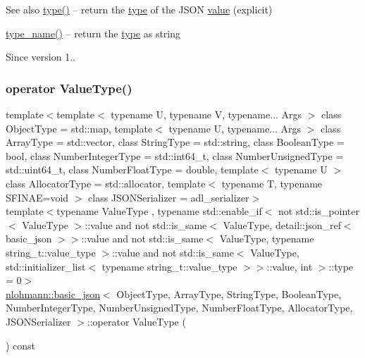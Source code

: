 \begin{DoxySeeAlso}{See also}
\mbox{\hyperlink{classnlohmann_1_1basic__json_a2b2d781d7f2a4ee41bc0016e931cadf7}{type()}} -- return the \mbox{\hyperlink{classnlohmann_1_1basic__json_a2b2d781d7f2a4ee41bc0016e931cadf7}{type}} of the J\+S\+ON \mbox{\hyperlink{classnlohmann_1_1basic__json_adcf8ca5079f5db993820bf50036bf45d}{value}} (explicit) 

\mbox{\hyperlink{classnlohmann_1_1basic__json_a9d0a478571f82f0163b96b2424cd998f}{type\+\_\+name()}} -- return the \mbox{\hyperlink{classnlohmann_1_1basic__json_a2b2d781d7f2a4ee41bc0016e931cadf7}{type}} as string
\end{DoxySeeAlso}
\begin{DoxySince}{Since}
version 1.. 
\end{DoxySince}
\mbox{\label{classnlohmann_1_1basic__json_a1f1d4bc973c5b866db3d96e14d2c9f3f}} 
\subsubsection{\texorpdfstring{operator Value\+Type()}{operator ValueType()}}
{\footnotesize\ttfamily template$<$template$<$ typename U, typename V, typename... Args $>$ class Object\+Type = std\+::map, template$<$ typename U, typename... Args $>$ class Array\+Type = std\+::vector, class String\+Type  = std\+::string, class Boolean\+Type  = bool, class Number\+Integer\+Type  = std\+::int64\+\_\+t, class Number\+Unsigned\+Type  = std\+::uint64\+\_\+t, class Number\+Float\+Type  = double, template$<$ typename U $>$ class Allocator\+Type = std\+::allocator, template$<$ typename T, typename S\+F\+I\+N\+A\+E=void $>$ class J\+S\+O\+N\+Serializer = adl\+\_\+serializer$>$ \\
template$<$typename Value\+Type , typename std\+::enable\+\_\+if$<$ not std\+::is\+\_\+pointer$<$ Value\+Type $>$\+::value and not std\+::is\+\_\+same$<$ Value\+Type, detail\+::json\+\_\+ref$<$ basic\+\_\+json $>$$>$\+::value and not std\+::is\+\_\+same$<$ Value\+Type, typename string\+\_\+t\+::value\+\_\+type $>$\+::value and not std\+::is\+\_\+same$<$ Value\+Type, std\+::initializer\+\_\+list$<$ typename string\+\_\+t\+::value\+\_\+type $>$$>$\+::value, int $>$\+::type  = 0$>$ \\
\mbox{\hyperlink{classnlohmann_1_1basic__json}{nlohmann\+::basic\+\_\+json}}$<$ Object\+Type, Array\+Type, String\+Type, Boolean\+Type, Number\+Integer\+Type, Number\+Unsigned\+Type, Number\+Float\+Type, Allocator\+Type, J\+S\+O\+N\+Serializer $>$\+::operator Value\+Type (\begin{DoxyParamCaption}{ }\end{DoxyParamCaption}) const\hspace{0.3cm}{\ttfamily [inline]}}



